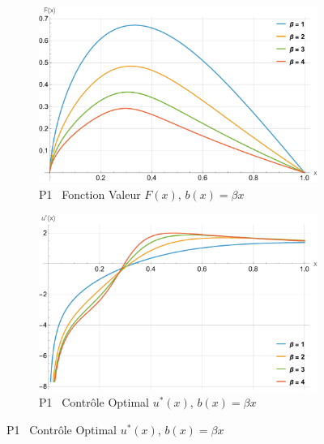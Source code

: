\begin{figure}[htb]
    \begin{subfigure}{0.49\linewidth}
        \includegraphics[width=\linewidth]{img/validation/P1/p1_B_value.pdf}
        \caption{P1 \textemdash~Fonction Valeur $F(x)$, $b(x)=\beta x$}\label{fig:BetaValueVisualisation1}
    \end{subfigure}
    \hfill
    \begin{subfigure}{0.49\linewidth}
        \includegraphics[width=\linewidth]{img/validation/P1/p1_B_control.pdf}
        \caption{P1 \textemdash~Contrôle Optimal $u^*(x)$, $b(x)=\beta x$}\label{fig:BetaControlVisualisation1}
    \end{subfigure}


\end{figure}
